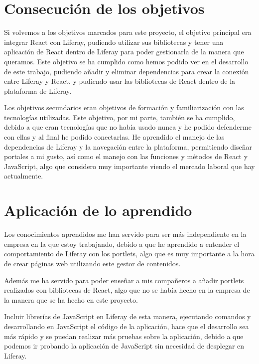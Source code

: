 \documentclass[a4paper, 12pt]{book}
\begin{document}
\section{Consecución de los objetivos}
\label{sec:consecucion_objectivos}
Si volvemos a los objetivos marcados para este proyecto, el objetivo principal era integrar React con Liferay, pudiendo utilizar sus bibliotecas y tener una aplicación de React dentro de Liferay para poder gestionarla de la manera que queramos. Este objetivo se ha cumplido como hemos podido ver en el desarrollo de este trabajo, pudiendo añadir y eliminar dependencias para crear la conexión entre Liferay y React, y pudiendo usar las bibliotecas de React dentro de la plataforma de Liferay.

\vspace{5mm}
Los objetivos secundarios eran objetivos de formación y familiarización con las tecnologías utilizadas. Este objetivo, por mi parte, también se ha cumplido, debido a que eran tecnologías que no había usado nunca y he podido defenderme con ellas y al final he podido conectarlas. He aprendido el manejo de las dependencias de Liferay y la navegación entre la plataforma, permitiendo diseñar portales a mi gusto, así como el manejo con las funciones y métodos de React y JavaScript, algo que considero muy importante viendo el mercado laboral que hay actualmente.

\section{Aplicación de lo aprendido}
\label{sec:consecucion_objectivos}
Los conocimientos aprendidos me han servido para ser más independiente en la empresa en la que estoy trabajando, debido a que he aprendido a entender el comportamiento de Liferay con los portlets, algo que es muy importante a la hora de crear páginas web utilizando este gestor de contenidos.

\vspace{5mm}
Además me ha servido para poder enseñar a mis compañeros a añadir portlets realizados con bibliotecas de React, algo que no se había hecho en la empresa de la manera que se ha hecho en este proyecto. 

Incluir librerías de JavaScript en Liferay de esta manera, ejecutando comandos y desarrollando en JavaScript el código de la aplicación, hace que el desarrollo sea más rápido y se puedan realizar más pruebas sobre la aplicación, debido a que podemos ir probando la aplicación de JavaScript sin necesidad de desplegar en Liferay.
\end{document}
